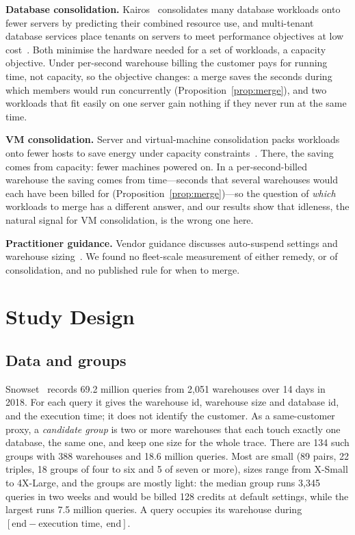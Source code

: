 \documentclass[conference]{IEEEtran}
\begin{document}
\textbf{Database consolidation.} Kairos~\cite{kairos11} consolidates many database workloads onto fewer servers by
predicting their combined resource use, and multi-tenant database services place tenants on servers to meet performance
objectives at low cost~\cite{lang14}. Both minimise the hardware needed for a set of workloads, a capacity objective. Under
per-second warehouse billing the customer pays for running time, not capacity, so the objective changes: a merge saves the
seconds during which members would run concurrently (Proposition~\ref{prop:merge}), and two workloads that fit easily on
one server gain nothing if they never run at the same time.

\textbf{VM consolidation.} Server and virtual-machine consolidation packs workloads onto fewer hosts to save energy under
capacity constraints~\cite{beloglazov12}. There, the saving comes from capacity: fewer machines powered on. In a
per-second-billed warehouse the saving comes from time---seconds that several warehouses would each have been billed for
(Proposition~\ref{prop:merge})---so the question of \emph{which} workloads to merge has a different answer, and our results
show that idleness, the natural signal for VM consolidation, is the wrong one here.

\textbf{Practitioner guidance.} Vendor guidance discusses auto-suspend settings and warehouse sizing~\cite{sf-considerations}.
We found no fleet-scale measurement of either remedy, or of consolidation, and no published rule for when to merge.

\section{Study Design}\label{sec:design}
\subsection{Data and groups}
Snowset~\cite{snowset} records 69.2 million queries from 2,051 warehouses over 14 days in 2018. For each query it gives the
warehouse id, warehouse size and database id, and the execution time; it does not identify the customer. As a same-customer
proxy, a \emph{candidate group} is two or more warehouses that each touch exactly one database, the same one, and keep one
size for the whole trace. There are 134 such groups with 388 warehouses and 18.6 million queries. Most are small (89 pairs,
22 triples, 18 groups of four to six and 5 of seven or more), sizes range from X-Small to 4X-Large, and the groups are mostly
light: the median group runs 3,345 queries in two weeks and would be billed 128 credits at default settings, while the
largest runs 7.5 million queries. A query occupies its warehouse during $[\text{end} - \text{execution time},\ \text{end}]$.
\end{document}
